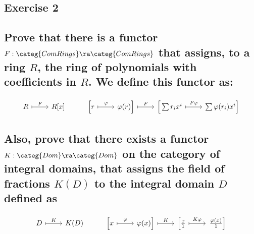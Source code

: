 \HRule
\subsection*{Exercise 2}
\subsection*{ %
Prove that there is a functor $F:\categ{ComRings}\ra\categ{ComRings}$ that assigns, to a ring $R$, the ring of polynomials
with coefficients in $R$. We define this functor as:}
\[
\begin{tikzcd}
        R \arrow[r,mapsto,"F"] &
        R[x] &
        \Big[ r \arrow[r,mapsto,"\varphi"] &
        \varphi(r) \Big] \arrow[r,mapsto,"F"] &
        \Big[ \sum r_i x^i \arrow[r,mapsto,"F\varphi"] &
        \sum \varphi(r_i)x^i \Big]
\end{tikzcd}
\]
\subsection*{
Also, prove that there exists a functor $K:\categ{Dom}\ra\categ{Dom}$ on the category of integral domains,
that assigns the field of fractions $K(D)$ to the integral domain $D$ defined as}
\[
\begin{tikzcd}
        D \arrow[r,mapsto,"K"] &
        K(D) &
        \Big[ x \arrow[r,mapsto,"\varphi"] &
        \varphi(x)\Big] \arrow[r,mapsto,"K"] &
        \Big[ \frac{x}{1} \arrow[r,mapsto,"K\varphi"] &
        \left. \frac{\varphi(x)}{1} \right]
\end{tikzcd}
\]



